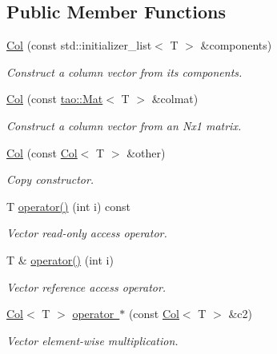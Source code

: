 \subsection*{Public Member Functions}
\begin{DoxyCompactItemize}
\item 
\mbox{\hyperlink{classtao_1_1_col_a9133bec2b352e2e139e51e1f9107473d}{Col}} (const std\+::initializer\+\_\+list$<$ T $>$ \&components)
\begin{DoxyCompactList}\small\item\em Construct a column vector from its components. \end{DoxyCompactList}\item 
\mbox{\label{classtao_1_1_col_af10fd1d477800a898d3c7eea90e5089c}} 
\mbox{\hyperlink{classtao_1_1_col_af10fd1d477800a898d3c7eea90e5089c}{Col}} (const \mbox{\hyperlink{classtao_1_1_mat}{tao\+::\+Mat}}$<$ T $>$ \&colmat)
\begin{DoxyCompactList}\small\item\em Construct a column vector from an Nx1 matrix. \end{DoxyCompactList}\item 
\mbox{\hyperlink{classtao_1_1_col_a6015ff83a28c5289050171e762e174fc}{Col}} (const \mbox{\hyperlink{classtao_1_1_col}{Col}}$<$ T $>$ \&other)
\begin{DoxyCompactList}\small\item\em Copy constructor. \end{DoxyCompactList}\item 
T \mbox{\hyperlink{classtao_1_1_col_a7d08ac2d077bed978eb783b5fe707a7c}{operator()}} (int i) const
\begin{DoxyCompactList}\small\item\em Vector read-\/only access operator. \end{DoxyCompactList}\item 
T \& \mbox{\hyperlink{classtao_1_1_col_ad7f3279e2764f5e1b0762e62517e738a}{operator()}} (int i)
\begin{DoxyCompactList}\small\item\em Vector reference access operator. \end{DoxyCompactList}\item 
\mbox{\hyperlink{classtao_1_1_col}{Col}}$<$ T $>$ \mbox{\hyperlink{classtao_1_1_col_a661dd9512fad58cfbedfdf52ca6806fb}{operator $\ast$}} (const \mbox{\hyperlink{classtao_1_1_col}{Col}}$<$ T $>$ \&c2)
\begin{DoxyCompactList}\small\item\em Vector element-\/wise multiplication. \end{DoxyCompactList}\item 

\end{DoxyCompactItemize}
